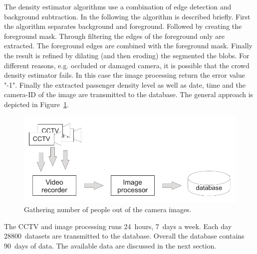 The density estimator algorithms use a combination of edge detection and background subtraction. In the  following the algorithm is described briefly.
First the algorithm separates background and foreground. Followed by creating the foreground mask.
Through filtering the edges of the foreground only are extracted. The foreground edges are combined with the foreground mask. Finally the result is refined by dilating (and then eroding) the segmented the blobs. %
For different reasons, e.g. occluded or damaged camera, it is possible that the crowd density estimator fails. In this case the image processing return the error value "-1".
Finally the extracted passenger density level as well as date, time and the camera-ID of the image are transmitted to the database. The general approach is depicted in Figure~\ref{fig:CCTVimageProcessing}.

\begin{figure}[htbp]
  \centering
  \includegraphics[width=\linewidth]{Figures/imageProcessing.pdf} 
  \caption{Gathering number of people out of the camera images.}
  \label{fig:CCTVimageProcessing}
\end{figure}

The CCTV and image processing runs 24~hours, 7~days a week. Each day 28800~datasets are transmitted to the database. Overall the database contains 90~days of data. The available data are discussed in the next section.

